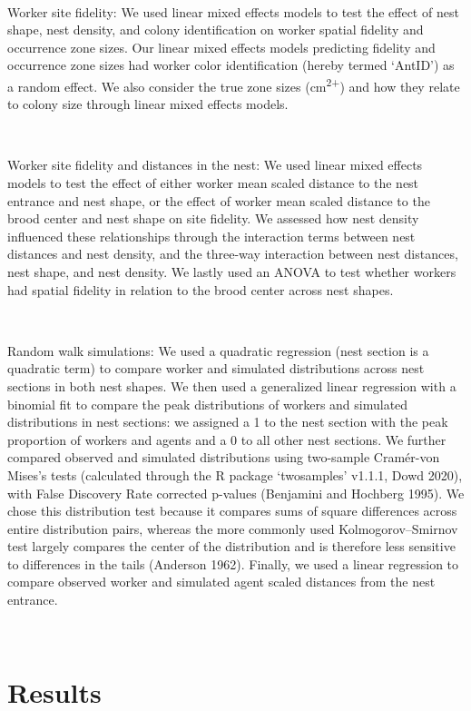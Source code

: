 \documentclass[3p]{elsarticle} %
\begin{document}
~

Worker site fidelity: We used linear mixed effects models to test the
effect of nest shape, nest density, and colony identification on worker
spatial fidelity and occurrence zone sizes. Our linear mixed effects
models predicting fidelity and occurrence zone sizes had worker color
identification (hereby termed `AntID') as a random effect. We also
consider the true zone sizes (cm\textsuperscript{2+}) and how they
relate to colony size through linear mixed effects models.

~

Worker site fidelity and distances in the nest: We used linear mixed
effects models to test the effect of either worker mean scaled distance
to the nest entrance and nest shape, or the effect of worker mean scaled
distance to the brood center and nest shape on site fidelity. We
assessed how nest density influenced these relationships through the
interaction terms between nest distances and nest density, and the
three-way interaction between nest distances, nest shape, and nest
density. We lastly used an ANOVA to test whether workers had spatial
fidelity in relation to the brood center across nest shapes.

~

Random walk simulations: We used a quadratic regression (nest section is
a quadratic term) to compare worker and simulated distributions across
nest sections in both nest shapes. We then used a generalized linear
regression with a binomial fit to compare the peak distributions of
workers and simulated distributions in nest sections: we assigned a 1 to
the nest section with the peak proportion of workers and agents and a 0
to all other nest sections. We further compared observed and simulated
distributions using two-sample Cramér-von Mises's tests (calculated
through the R package `twosamples' v1.1.1, Dowd 2020), with False
Discovery Rate corrected p-values (Benjamini and Hochberg 1995). We
chose this distribution test because it compares sums of square
differences across entire distribution pairs, whereas the more commonly
used Kolmogorov--Smirnov test largely compares the center of the
distribution and is therefore less sensitive to differences in the tails
(Anderson 1962). Finally, we used a linear regression to compare
observed worker and simulated agent scaled distances from the nest
entrance.

~

\hypertarget{results}{%
\section{Results}\label{results}}
\end{document}
